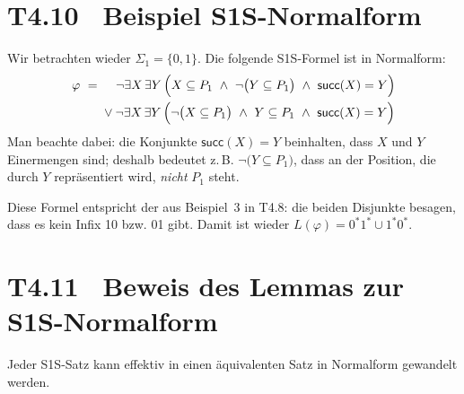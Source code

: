 \documentclass[fontsize=11pt, twoside=false, numbers=autoenddot]{scrbook}
\begin{document}
\section*{T4.10~ Beispiel S1S-Normalform}

Wir betrachten wieder $\Sigma_1 = \{0,1\}$.
Die folgende S1S-Formel ist in Normalform:
\begin{align*}
  \varphi    & ~=~ \hspace*{3mm}      \lnot \exists X\, \exists Y\,\Big(X \subseteq P_1 ~\land~ \lnot\big(Y \subseteq P_1\big) ~\land~ \textsf{succ}(X)=Y \Big) \\
             &     \hspace*{6mm} \lor \lnot \exists X\, \exists Y\,\Big(\lnot\big(X \subseteq P_1\big) ~\land~ Y \subseteq P_1 ~\land~ \textsf{succ}(X)=Y \Big)
\end{align*}
Man beachte dabei: die Konjunkte $\textsf{succ}(X)=Y$ beinhalten, dass $X$ und $Y$ Einermengen sind;
deshalb bedeutet z.\,B. $\lnot\big(Y \subseteq P_1\big)$, dass
an der Position, die durch $Y$ repräsentiert wird, \emph{nicht} $P_1$ steht.

Diese Formel entspricht der aus Beispiel~3 in T4.8:
die beiden Disjunkte besagen, dass es kein Infix 10 bzw. 01 gibt.
Damit ist wieder $L(\varphi) = 0^*1^* \cup 1^*0^*$.

\section*{T4.11~ Beweis des Lemmas zur S1S-Normalform}

Jeder S1S-Satz kann effektiv in einen äquivalenten Satz in Normalform gewandelt werden.
\end{document}

